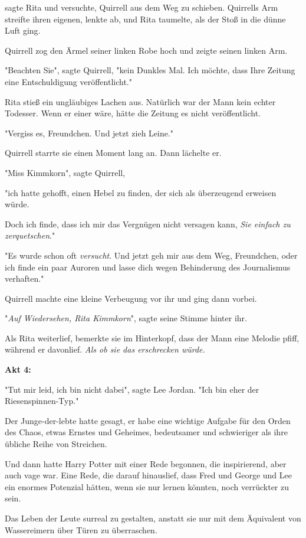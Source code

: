 {sagte Rita und versuchte, Quirrell aus dem Weg zu schieben. Quirrells Arm streifte ihren eigenen, lenkte ab, und Rita taumelte, als der Stoß in die dünne Luft ging.

Quirrell zog den Ärmel seiner linken Robe hoch und zeigte seinen linken Arm.

"Beachten Sie", sagte Quirrell, "kein Dunkles Mal. Ich möchte, dass Ihre Zeitung eine Entschuldigung veröffentlicht."

Rita stieß ein ungläubiges Lachen aus. Natürlich war der Mann kein echter Todesser. Wenn er einer wäre, hätte die Zeitung es nicht veröffentlicht.

"Vergiss es, Freundchen. Und jetzt zieh Leine."

Quirrell starrte sie einen Moment lang an. Dann lächelte er.

"Miss Kimmkorn", sagte Quirrell,

"ich hatte gehofft, einen Hebel zu finden, der sich als überzeugend erweisen würde.

Doch ich finde, dass ich mir das Vergnügen nicht versagen kann, \emph{Sie einfach zu zerquetschen}."

"Es wurde schon oft \emph{versucht}. Und jetzt geh mir aus dem Weg, Freundchen, oder ich finde ein paar Auroren und lasse dich wegen Behinderung des Journalismus verhaften."

Quirrell machte eine kleine Verbeugung vor ihr und ging dann vorbei.

"\emph{Auf Wiedersehen, Rita Kimmkorn}", sagte seine Stimme hinter ihr.

Als Rita weiterlief, bemerkte sie im Hinterkopf, dass der Mann eine Melodie pfiff, während er davonlief. \emph{Als ob sie das erschrecken würde.}

\textbf{Akt 4:}

"Tut mir leid, ich bin nicht dabei", sagte Lee Jordan. "Ich bin eher der Riesenspinnen-Typ."

Der Junge-der-lebte hatte gesagt, er habe eine wichtige Aufgabe für den Orden des Chaos, etwas Ernstes und Geheimes, bedeutsamer und schwieriger als ihre übliche Reihe von Streichen.

Und dann hatte Harry Potter mit einer Rede begonnen, die inspirierend, aber auch vage war. Eine Rede, die darauf hinauslief, dass Fred und George und Lee ein enormes Potenzial hätten, wenn sie nur lernen könnten, noch verrückter zu sein.

Das Leben der Leute surreal zu gestalten, anstatt sie nur mit dem Äquivalent von Wassereimern über Türen zu überraschen.

}
